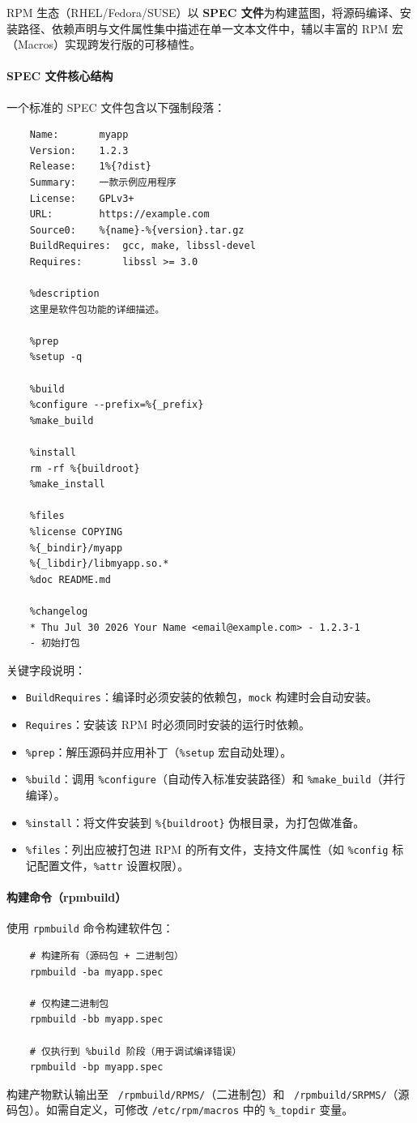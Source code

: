 \documentclass[12pt,UTF8]{ctexbook}
\begin{document}
RPM 生态（RHEL/Fedora/SUSE）以 \textbf{SPEC 文件}为构建蓝图，将源码编译、安装路径、依赖声明与文件属性集中描述在单一文本文件中，辅以丰富的 RPM 宏（Macros）实现跨发行版的可移植性。

\paragraph{SPEC 文件核心结构}
一个标准的 SPEC 文件包含以下强制段落：

\begin{verbatim}
	Name:       myapp
	Version:    1.2.3
	Release:    1%{?dist}
	Summary:    一款示例应用程序
	License:    GPLv3+
	URL:        https://example.com
	Source0:    %{name}-%{version}.tar.gz
	BuildRequires:  gcc, make, libssl-devel
	Requires:       libssl >= 3.0
	
	%description
	这里是软件包功能的详细描述。
	
	%prep
	%setup -q
	
	%build
	%configure --prefix=%{_prefix}
	%make_build
	
	%install
	rm -rf %{buildroot}
	%make_install
	
	%files
	%license COPYING
	%{_bindir}/myapp
	%{_libdir}/libmyapp.so.*
	%doc README.md
	
	%changelog
	* Thu Jul 30 2026 Your Name <email@example.com> - 1.2.3-1
	- 初始打包
\end{verbatim}

关键字段说明：
\begin{itemize}
	\item \texttt{BuildRequires}：编译时必须安装的依赖包，\texttt{mock} 构建时会自动安装。
	\item \texttt{Requires}：安装该 RPM 时必须同时安装的运行时依赖。
	\item \texttt{\%prep}：解压源码并应用补丁（\texttt{\%setup} 宏自动处理）。
	\item \texttt{\%build}：调用 \texttt{\%configure}（自动传入标准安装路径）和 \texttt{\%make\_build}（并行编译）。
	\item \texttt{\%install}：将文件安装到 \texttt{\%\{buildroot\}} 伪根目录，为打包做准备。
	\item \texttt{\%files}：列出应被打包进 RPM 的所有文件，支持文件属性（如 \texttt{\%config} 标记配置文件，\texttt{\%attr} 设置权限）。
\end{itemize}

\paragraph{构建命令（rpmbuild）}
使用 \texttt{rpmbuild} 命令构建软件包：
\begin{verbatim}
	# 构建所有（源码包 + 二进制包）
	rpmbuild -ba myapp.spec
	
	# 仅构建二进制包
	rpmbuild -bb myapp.spec
	
	# 仅执行到 %build 阶段（用于调试编译错误）
	rpmbuild -bp myapp.spec
\end{verbatim}
构建产物默认输出至 \texttt{~/rpmbuild/RPMS/}（二进制包）和 \texttt{~/rpmbuild/SRPMS/}（源码包）。如需自定义，可修改 \texttt{/etc/rpm/macros} 中的 \texttt{\%\_topdir} 变量。
\end{document}
